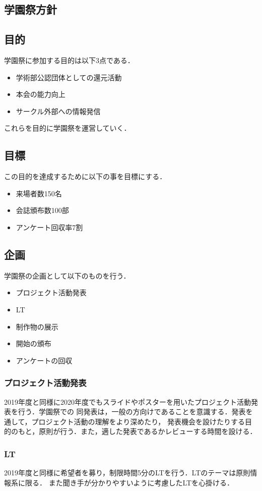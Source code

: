\subsection*{学園祭方針}


\subsection*{目的}
学園祭に参加する目的は以下3点である．
\begin{itemize}
    \item 学術部公認団体としての還元活動
    \item 本会の能力向上
    \item サークル外部への情報発信
\end{itemize}
これらを目的に学園祭を運営していく．
\subsection*{目標}
この目的を達成するために以下の事を目標にする．
\begin{itemize}
    \item 来場者数150名
    \item 会誌頒布数100部
    \item アンケート回収率7割
\end{itemize}
\subsection*{企画}
学園祭の企画として以下のものを行う．
\begin{itemize}
    \item プロジェクト活動発表
    \item LT
    \item 制作物の展示
    \item 開始の頒布
    \item アンケートの回収
\end{itemize}
\subsubsection*{プロジェクト活動発表}
2019年度と同様に2020年度でもスライドやポスターを用いたプロジェクト活動発表を行う．学園祭での
同発表は，一般の方向けであることを意識する．発表を通して，プロジェクト活動の理解をより深めたり，
発表機会を設けたりする目的のもと，原則\firstGrade{}が行う．また，適した発表であるかレビューする時間を設ける．

\subsubsection*{LT}
2019年度と同様に希望者を募り，制限時間5分のLTを行う．LTのテーマは原則情報系に限る．
また聞き手が分かりやすいように考慮したLTを心掛ける．

